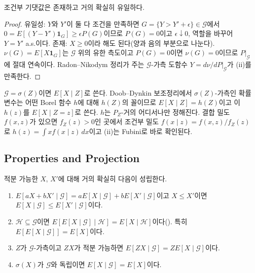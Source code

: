 \begin{theorem}
\label{thm:condexp-exists}
조건부 기댓값은 존재하고 거의 확실히 유일하다.
\end{theorem}

\begin{proof}
유일성: $Y$와 $Y'$이 둘 다 조건을 만족하면 $G=\{Y>Y'+\epsilon\}\in\mathcal G$에서 $0=E[(Y-Y')\mathbf 1_G]\ge\epsilon P(G)$이므로 $P(G)=0$이고 $\epsilon\downarrow0$, 역할을 바꾸어 $Y=Y'$ a.s.이다. 존재: $X\ge0$이라 해도 된다(양과 음의 부분으로 나눈다). $\nu(G)=E[X\mathbf 1_G]$는 $\mathcal G$ 위의 유한 측도이고 $P(G)=0$이면 $\nu(G)=0$이므로 $P|_{\mathcal G}$에 절대 연속이다. Radon--Nikodym 정리가 주는 $\mathcal G$-가측 도함수 $Y=d\nu/dP|_{\mathcal G}$가 (ii)를 만족한다.
\end{proof}

$\mathcal G=\sigma(Z)$이면 $E[X\mid Z]$로 쓴다. Doob--Dynkin 보조정리에서 $\sigma(Z)$-가측인 확률변수는 어떤 Borel 함수 $h$에 대해 $h(Z)$의 꼴이므로 $E[X\mid Z]=h(Z)$이고 이 $h(z)$를 $E[X\mid Z=z]$로 쓴다. $h$는 $P_Z$-거의 어디서나만 정해진다. 결합 밀도 $f(x,z)$가 있으면 $f_Z(z)>0$인 곳에서 조건부 밀도 $f(x\mid z)=f(x,z)/f_Z(z)$로 $h(z)=\int xf(x\mid z)\,dx$이고 (ii)는 Fubini로 바로 확인된다.

\subsection{Properties and Projection}

\begin{proposition}
\label{prop:condexp-properties}
적분 가능한 $X$, $X'$에 대해 거의 확실히 다음이 성립한다.
\begin{enumerate}
\item $E[aX+bX'\mid\mathcal G]=aE[X\mid\mathcal G]+bE[X'\mid\mathcal G]$이고 $X\le X'$이면 $E[X\mid\mathcal G]\le E[X'\mid\mathcal G]$이다.
\item $\mathcal H\subseteq\mathcal G$이면 $E[E[X\mid\mathcal G]\mid\mathcal H]=E[X\mid\mathcal H]$이다(). 특히 $E[E[X\mid\mathcal G]]=E[X]$이다.
\item $Z$가 $\mathcal G$-가측이고 $ZX$가 적분 가능하면 $E[ZX\mid\mathcal G]=ZE[X\mid\mathcal G]$이다.
\item $\sigma(X)$가 $\mathcal G$와 독립이면 $E[X\mid\mathcal G]=E[X]$이다.
\end{enumerate}
\end{proposition}


